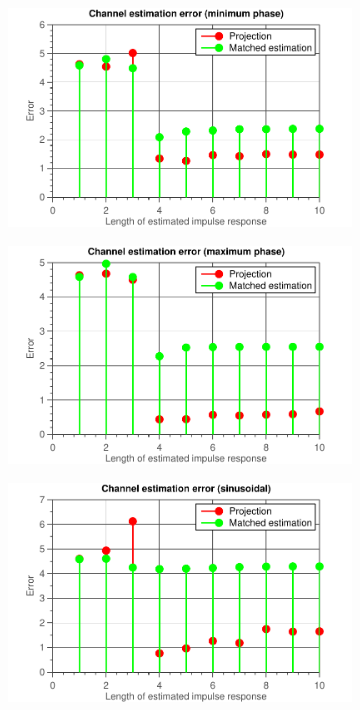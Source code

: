 \documentclass[11pt,titlepage]{report}
\begin{document}
\begin{figure}[H]
	\centering
	\begin{subfigure}{0.49\textwidth}
		\includegraphics[width=\textwidth]{../../deliverable-7-resources/figures/ass-1/report-8-9-10/report-9-noise-0.5/ass-1-report-9-minimum-phase.pdf}
	\end{subfigure}
	\begin{subfigure}{0.49\textwidth}
		\includegraphics[width=\textwidth]{../../deliverable-7-resources/figures/ass-1/report-8-9-10/report-9-noise-0.5/ass-1-report-9-maximum-phase.pdf}
	\end{subfigure}
	\begin{subfigure}{0.49\textwidth}
		\includegraphics[width=\textwidth]{../../deliverable-7-resources/figures/ass-1/report-8-9-10/report-9-noise-0.5/ass-1-report-9-sinusoidal.pdf}

\end{subfigure}
\end{figure}
\end{document}
